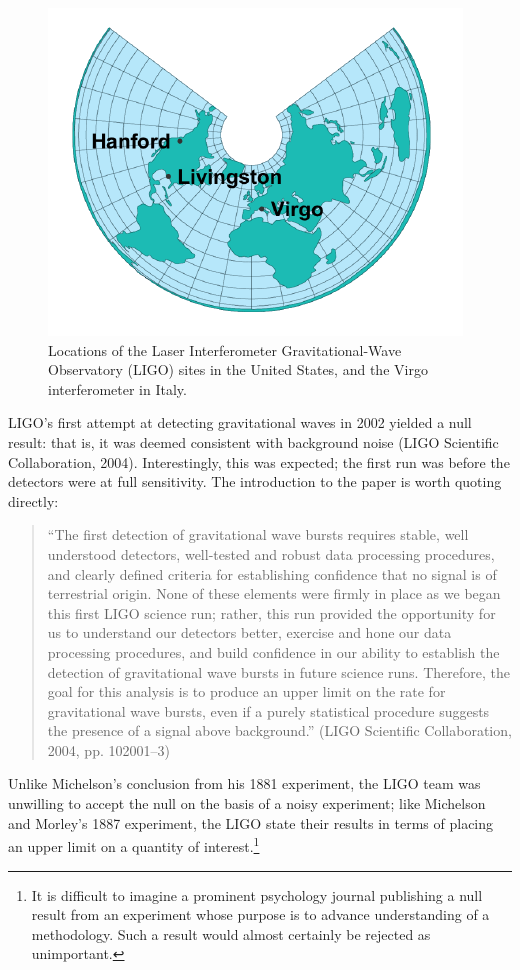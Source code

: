 \documentclass[english,floatsintext,man]{apa6}
\theoremstyle{definition}
\theoremstyle{definition}
\theoremstyle{definition}
\theoremstyle{remark}
\begin{document}
\begin{figure}
\centering
\includegraphics{paper_pdf_files/figure-latex/LIGOapp2-1.pdf}
\caption{\label{fig:LIGOapp2}Locations of the Laser Interferometer
Gravitational-Wave Observatory (LIGO) sites in the United States, and
the Virgo interferometer in Italy.}
\end{figure}

LIGO's first attempt at detecting gravitational waves in 2002 yielded a
null result: that is, it was deemed consistent with background noise
(LIGO Scientific Collaboration, 2004). Interestingly, this was expected;
the first run was before the detectors were at full sensitivity. The
introduction to the paper is worth quoting directly:

\begin{quote}
\enquote{The first detection of gravitational wave bursts requires
stable, well understood detectors, well-tested and robust data
processing procedures, and clearly defined criteria for establishing
confidence that no signal is of terrestrial origin. None of these
elements were firmly in place as we began this first LIGO science run;
rather, this run provided the opportunity for us to understand our
detectors better, exercise and hone our data processing procedures, and
build confidence in our ability to establish the detection of
gravitational wave bursts in future science runs. Therefore, the goal
for this analysis is to produce an upper limit on the rate for
gravitational wave bursts, even if a purely statistical procedure
suggests the presence of a signal above background.} (LIGO Scientific
Collaboration, 2004, pp. 102001--3)
\end{quote}

Unlike Michelson's conclusion from his 1881 experiment, the LIGO team
was unwilling to accept the null on the basis of a noisy experiment;
like Michelson and Morley's 1887 experiment, the LIGO state their
results in terms of placing an upper limit on a quantity of
interest.\footnote{It is difficult to imagine a prominent psychology
  journal publishing a null result from an experiment whose purpose is
  to advance understanding of a methodology. Such a result would almost
  certainly be rejected as unimportant.}
\end{document}
